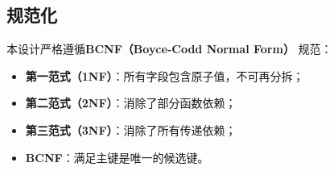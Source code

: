 \documentclass[11pt,a4paper]{article}
\renewcommand{\_}{\origunderscore\allowbreak}
\begin{document}

\subsection{规范化}

本设计严格遵循\textbf{BCNF（Boyce-Codd Normal Form）} 规范：

\begin{itemize}
    \item \textbf{第一范式（1NF）}：所有字段包含原子值，不可再分拆；
    \item \textbf{第二范式（2NF）}：消除了部分函数依赖；
    \item \textbf{第三范式（3NF）}：消除了所有传递依赖；
    \item \textbf{BCNF}：满足主键是唯一的候选键。
\end{itemize}
\end{document}
